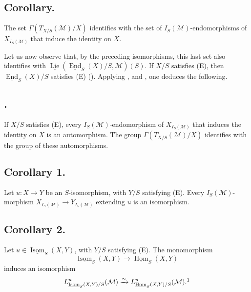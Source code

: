 \subsection*{Corollary.}
The set \(\Gamma(T_{X/S}(\mathcal M)/X)\) identifies with the set of
\(I_S(\mathcal M)\)-endomorphisms of \(X_{I_S(\mathcal M)}\) that induce
the identity on \(X\).

Let us now observe that, by the preceding isomorphisms, this last set also
identifies with
\(\underline{\operatorname{Lie}}(\underline{\operatorname{End}}_S(X)/S,\mathcal M)(S)\).
If \(X/S\) satisfies (E), then \(\underline{\operatorname{End}}_S(X)/S\)
satisfies (E) (). Applying
, and , one deduces the following.

\subsection*{.}
If \(X/S\) satisfies (E), every \(I_S(\mathcal M)\)-endomorphism of
\(X_{I_S(\mathcal M)}\) that induces the identity on \(X\) is an
automorphism. The group \(\Gamma(T_{X/S}(\mathcal M)/X)\) identifies with
the group of these automorphisms.

\subsection*{Corollary 1.}
Let \(u:X\to Y\) be an \(S\)-isomorphism, with \(Y/S\) satisfying (E).
Every \(I_S(\mathcal M)\)-morphism
\(X_{I_S(\mathcal M)}\to Y_{I_S(\mathcal M)}\) extending \(u\) is an
isomorphism.

\subsection*{Corollary 2.}
Let \(u\in\underline{\operatorname{Isom}}_S(X,Y)\), with \(Y/S\)
satisfying (E). The monomorphism
\[
  \underline{\operatorname{Isom}}_S(X,Y)
  \longrightarrow\underline{\operatorname{Hom}}_S(X,Y)
\]
induces an isomorphism
\[
  L^u_{\underline{\operatorname{Isom}}_S(X,Y)/S}(\mathcal M)
  \xrightarrow{\sim}
  L^u_{\underline{\operatorname{Hom}}_S(X,Y)/S}(\mathcal M).\footnotemark
\]

